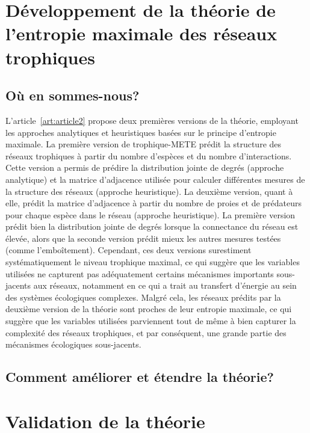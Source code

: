 \section{Développement de la théorie de l'entropie maximale des réseaux trophiques} 

\subsection{Où en sommes-nous?} 

L'article~\ref{art:article2} propose deux premières versions de la théorie,
employant les approches analytiques et heuristiques basées sur le principe
d'entropie maximale. La première version de trophique-METE prédit la structure
des réseaux trophiques à partir du nombre d'espèces et du nombre d'interactions.
Cette version a permis de prédire la distribution jointe de degrés (approche
analytique) et la matrice d'adjacence utilisée pour calculer différentes mesures
de la structure des réseaux (approche heuristique). La deuxième version, quant à
elle, prédit la matrice d'adjacence à partir du nombre de proies et de
prédateurs pour chaque espèce dans le réseau (approche heuristique). La première
version prédit bien la distribution jointe de degrés lorsque la connectance du
réseau est élevée, alors que la seconde version prédit mieux les autres mesures
testées (comme l'emboîtement). Cependant, ces deux versions surestiment
systématiquement le niveau trophique maximal, ce qui suggère que les variables
utilisées ne capturent pas adéquatement certains mécanismes importants
sous-jacents aux réseaux, notamment en ce qui a trait au transfert d'énergie au
sein des systèmes écologiques complexes. Malgré cela, les réseaux prédits par la
deuxième version de la théorie sont proches de leur entropie maximale, ce qui
suggère que les variables utilisées parviennent tout de même à bien capturer la
complexité des réseaux trophiques, et par conséquent, une grande partie des
mécanismes écologiques sous-jacents.

\subsection{Comment améliorer et étendre la théorie?} 




\section{Validation de la théorie} 

